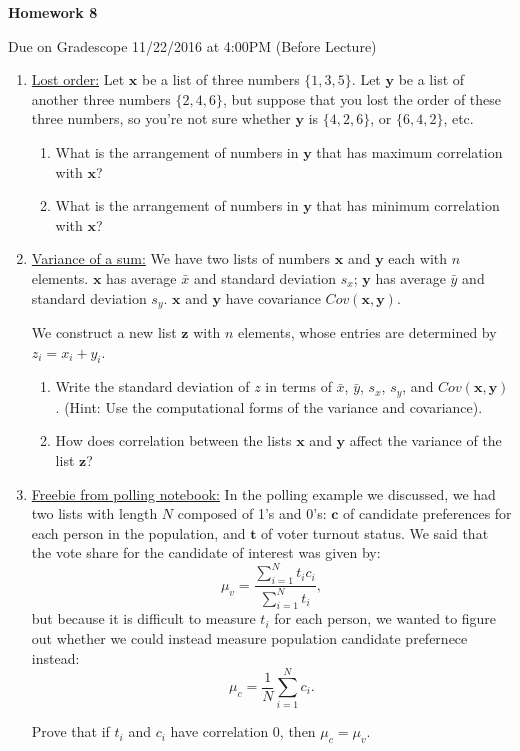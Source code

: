 \documentclass[11pt]{article}
\begin{document}
\centerline{\textbf{Homework 8}}
\centerline{Due on Gradescope 11/22/2016 at 4:00PM (Before Lecture)}

\begin{enumerate}
\item \underline{Lost order:} Let $\bm x$ be a list of three numbers $\{1, 3, 5\}$. Let $\bm y$ be a list of another three numbers $\{2, 4, 6\}$, but
suppose that you lost the order of these three numbers, so you're not sure whether $\bm y$ is $\{4, 2, 6\}$, or $\{6, 4, 2\}$, etc.
    \begin{enumerate}
        \item What is the arrangement of numbers in $\bm y$ that has maximum correlation with $\bm x$?
        \item What is the arrangement of numbers in $\bm y$ that has minimum correlation with $\bm x$?
    \end{enumerate}

\item \underline{Variance of a sum:}
We have two lists of numbers $\bm x$ and $\bm y$ each with $n$ elements. $\bm x$ has average $\bar x$ and standard deviation $s_x$;
$\bm y$ has average $\bar y$ and standard deviation $s_y$.
$\bm x$ and $\bm y$ have covariance $Cov(\bm x, \bm y)$.

 We construct a new list $\bm z$ with $n$ elements, whose entries are determined by $z_i = x_i + y_i$.

\begin{enumerate}
\item Write the standard deviation of $z$ in terms of $\bar x$, $\bar y$, $s_x$, $s_y$, and $Cov(\bm x, \bm y)$.
    (Hint: Use the computational forms of the variance and covariance).
\item How does correlation between the lists $\bm x$ and $\bm y$ affect the variance of the list $\bm z$?
\end{enumerate}

\item \underline{Freebie from polling notebook:}
In the polling example we discussed, we had two lists with length $N$ composed of 1's and 0's: $\bm c$ of candidate preferences for each person in the population, and $\bm t$ of voter turnout status.
We said that the vote share for the candidate of interest was given by:
$$
\mu_v = \frac{\sum_{i=1}^N t_i c_i}{\sum_{i=1}^N t_i},
$$
but because it is difficult to measure $t_i$ for each person, we wanted to figure out whether we could instead measure population candidate prefernece instead:
$$
\mu_c = \frac{1}{N} \sum_{i=1}^N c_i.
$$

Prove that if $t_i$ and $c_i$ have correlation 0, then $\mu_c = \mu_v$.
\end{enumerate}
\end{document}
